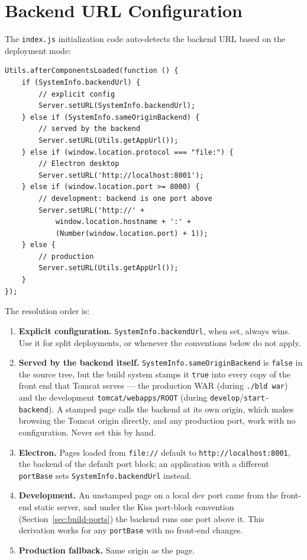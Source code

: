 \section{Backend URL Configuration}
\label{sec:fe-backend-url}

The \texttt{index.js} initialization code auto-detects the backend URL based on the deployment mode:

\begin{lstlisting}[style=javascript]
Utils.afterComponentsLoaded(function () {
    if (SystemInfo.backendUrl) {
        // explicit config
        Server.setURL(SystemInfo.backendUrl);
    } else if (SystemInfo.sameOriginBackend) {
        // served by the backend
        Server.setURL(Utils.getAppUrl());
    } else if (window.location.protocol === "file:") {
        // Electron desktop
        Server.setURL('http://localhost:8001');
    } else if (window.location.port >= 8000) {
        // development: backend is one port above
        Server.setURL('http://' +
            window.location.hostname + ':' +
            (Number(window.location.port) + 1));
    } else {
        // production
        Server.setURL(Utils.getAppUrl());
    }
});
\end{lstlisting}

The resolution order is:

\begin{enumerate}
  \item \textbf{Explicit configuration.}  \texttt{SystemInfo.backendUrl}, when set, always wins.  Use it for split deployments, or whenever the conventions below do not apply.
  \item \textbf{Served by the backend itself.}  \texttt{SystemInfo.sameOriginBackend} is \texttt{false} in the source tree, but the build system stamps it \texttt{true} into every copy of the front end that Tomcat serves --- the production WAR (during \texttt{./bld war}) and the development \texttt{tomcat/webapps/ROOT} (during \texttt{develop}/\texttt{start-backend}).  A stamped page calls the backend at its own origin, which makes browsing the Tomcat origin directly, and any production port, work with no configuration.  Never set this by hand.
  \item \textbf{Electron.}  Pages loaded from \texttt{file://} default to \texttt{http://localhost:8001}, the backend of the default port block; an application with a different \texttt{portBase} sets \texttt{SystemInfo.backendUrl} instead.
  \item \textbf{Development.}  An unstamped page on a local dev port came from the front-end static server, and under the Kiss port-block convention (Section~\ref{sec:build-ports}) the backend runs one port above it.  This derivation works for any \texttt{portBase} with no front-end changes.
  \item \textbf{Production fallback.}  Same origin as the page.
\end{enumerate}

